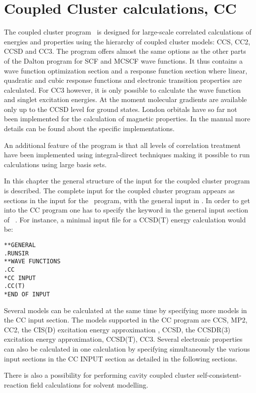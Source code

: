 \chapter{Coupled Cluster calculations, CC}\label{ch:CC}

The coupled cluster program \cc\ is designed for large-scale
correlated calculations of energies and properties using the
hierarchy of coupled cluster models: CCS, CC2, CCSD and CC3.
The program offers almost the same options as the other
parts of the Dalton program for SCF and MCSCF wave functions.
It thus contains a wave function optimization section and 
a response function section
where linear, quadratic and cubic response functions and electronic
transition properties are calculated.
For CC3 however, it is only possible to calculate the wave function and 
singlet excitation energies. 
At the moment molecular gradients are available 
only up to the CCSD level for ground states.  
London orbitals have so far not been implemented 
for the calculation of magnetic properties.
In the manual more details can be found about the specific implementations.

An additional feature of the program is that all levels of correlation
treatment have been implemented using integral-direct techniques making
it possible to run calculations using large basis sets.  

In this chapter the general structure of the input for the
coupled cluster program is described.
The complete input for the coupled cluster program appears as
sections in the input for the \sir\ program, with the general
input in . In order to get into the CC program
one has to specify the  keyword in the general input
section of \sir\ . For instance, a minimal
input file for a CCSD(T) energy calculation would be:
\begin{verbatim}
**GENERAL
.RUNSIR
**WAVE FUNCTIONS
.CC
*CC INPUT
.CC(T)
*END OF INPUT
\end{verbatim}

Several models can be calculated at the same time by specifying more models
in the CC input section. 
The models supported in the CC program are 
CCS\cite{Christiansen:CPL243},
MP2\cite{Moller34},
CC2\cite{Christiansen:CPL243},
the CIS(D) excitation energy approximation \cite{Head-Gordon:94},
CCSD\cite{Purvis82},
the CCSDR(3) excitation energy approximation\cite{Christiansen:PERTURBATIVE_TRIPLES}, 
CCSD(T)\cite{Raghavachari89}, CC3\cite{Christiansen:JCP103,Koch:JCP106}.
Several electronic properties can also 
be calculated in one calculation by specifying simultaneously 
the various input sections in the CC INPUT section
as detailed in the following sections.

There is also a possibility for performing cavity coupled cluster
self-consistent-reaction field calculations for solvent modelling.
